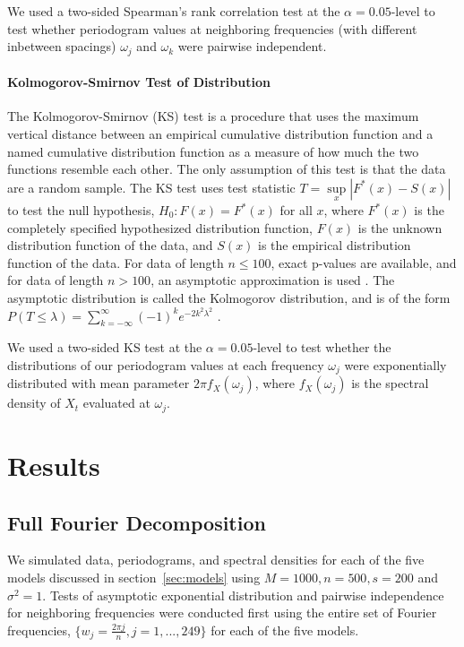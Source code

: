 \documentclass{article}\usepackage[]{graphicx}\usepackage[]{color}
\theoremstyle{plain}
\begin{document}
We used a two-sided Spearman's rank correlation test at the $\alpha = 0.05$-level to test whether periodogram values at neighboring frequencies (with different inbetween spacings) $\omega_j$ and $\omega_k$ were pairwise independent.


\paragraph{Kolmogorov-Smirnov Test of Distribution}
The Kolmogorov-Smirnov (KS) test is a procedure that uses the maximum vertical distance between an empirical cumulative distribution function and a named cumulative distribution function as a measure of how much the two functions resemble each other. The only assumption of this test is that the data are a random sample. The KS test uses test statistic $T = \sup\limits_x |F^*(x) - S(x)|$ to test the null hypothesis, $H_0: F(x) = F^*(x)$ for all $x$, where $F^*(x)$ is the completely specified hypothesized distribution function, $F(x)$ is the unknown distribution function of the data, and $S(x)$ is the empirical distribution function of the data. For data of length $n \le 100$, exact p-values are available, and for data of length $n > 100$, an asymptotic approximation is used \cite{conover1998practical}. The asymptotic distribution is called the Kolmogorov distribution, and is of the form $P(T \le \lambda) = \sum_{k=-\infty}^\infty (-1)^k e^{-2k^2 \lambda^2}$ \cite{kolmogorov1992empirical}.

We used a two-sided KS test at the $\alpha = 0.05$-level to test whether the distributions of our periodogram values at each frequency $\omega_j$ were exponentially distributed with mean parameter $2\pi f_X(\omega_j)$, where $f_X(\omega_j)$ is the spectral density of $X_t$ evaluated at $\omega_j$.




\section{Results}




\subsection{Full Fourier Decomposition}

We simulated data, periodograms, and spectral densities for each of the five models discussed in section~\ref{sec:models} using $M=1000, n=500, s=200$ and $\sigma^2=1$. Tests of asymptotic exponential distribution and pairwise independence for neighboring frequencies were conducted first using the entire set of Fourier frequencies, $\{w_j = \frac{2\pi j}{n}, j=1,...,249\}$ for each of the five models.
\end{document}
